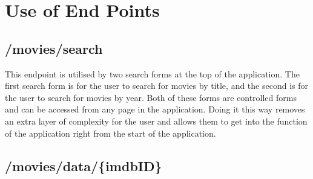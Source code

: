 \documentclass[12pt,a4paper]{article}
\begin{document}
	\newpage

	\section{Use of End Points}
		\subsection{/movies/search}
			This endpoint is utilised by two search forms at the top of the application. The first 
			search form is for the user to search for movies by title, and the second is for the user 
			to search for movies by year. Both of these forms are controlled forms and can be accessed 
			from any page in the application. Doing it this way removes an extra layer of complexity for 
			the user and allows them to get into the function of the application right from the start of
			the application.\\

			\begin{center}
			\end{center}

		\subsection{/movies/data/\{imdbID\}}
\end{document}
